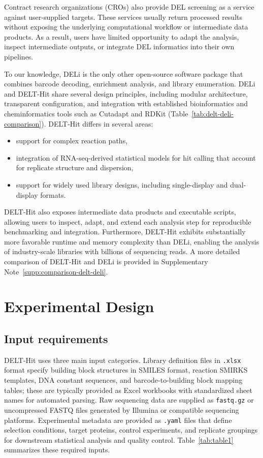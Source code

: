 \documentclass[pdflatex,sn-nature]{sn-jnl}
\begin{document}
Contract research organizations (CROs) also provide DEL screening as a service against user-supplied targets. These services usually return processed results without exposing the underlying computational workflow or intermediate data products. As a result, users have limited opportunity to adapt the analysis, inspect intermediate outputs, or integrate DEL informatics into their own pipelines.

To our knowledge, DELi\cite{wellnitz_opensourcednaencodedlibrary_2025} is the only other open-source software package that combines barcode decoding, enrichment analysis, and library enumeration. DELi and DELT-Hit share several design principles, including modular architecture, transparent configuration, and integration with established bioinformatics and cheminformatics tools such as Cutadapt and RDKit (Table~\ref{tab:delt-deli-comparison}). DELT-Hit differs in several areas:

\begin{itemize}
  \item support for complex reaction paths,
  \item integration of RNA-seq-derived statistical models for hit calling that account for replicate structure and dispersion,
  \item support for widely used library designs, including single-display and dual-display formats.
\end{itemize}

DELT-Hit also exposes intermediate data products and executable scripts, allowing users to inspect, adapt, and extend each analysis step for reproducible benchmarking and integration. Furthermore, DELT-Hit exhibits substantially more favorable runtime and memory complexity than DELi, enabling the analysis of industry-scale libraries with billions of sequencing reads. A more detailed comparison of DELT-Hit and DELi is provided in Supplementary Note~\ref{supp:comparison-delt-deli}.

\section{Experimental Design}

\subsection{Input requirements}
DELT-Hit uses three main input categories. Library definition files in \texttt{.xlsx} format specify building block structures in SMILES format, reaction SMIRKS templates, DNA constant sequences, and barcode-to-building block mapping tables; these are typically provided as Excel workbooks with standardized sheet names for automated parsing. Raw sequencing data are supplied as \texttt{fastq.gz} or uncompressed FASTQ files generated by Illumina or compatible sequencing platforms. Experimental metadata are provided as \texttt{.yaml} files that define selection conditions, target proteins, control experiments, and replicate groupings for downstream statistical analysis and quality control. Table~\ref{tab:table1} summarizes these required inputs.
\end{document}
